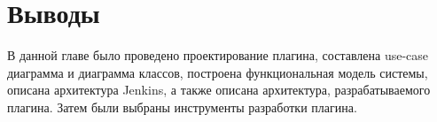 \section{Выводы} \label{ch1:sec7}

В данной главе было проведено проектирование плагина, составлена use-case диаграмма и диаграмма классов, построена функциональная модель системы, описана архитектура Jenkins, а также описана архитектура, разрабатываемого плагина. Затем были выбраны инструменты разработки плагина.


%
